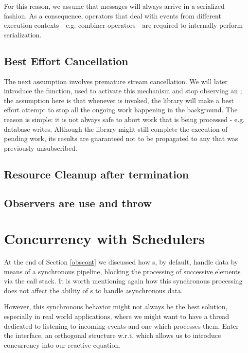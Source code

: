 For this reason, we assume that messages will always arrive in a serialized fashion. As a consequence, operators that deal with events from different execution contexts - e.g. combiner operators - are required to internally perform serialization.

\subsection{Best Effort Cancellation}
\label{ass-besteffort}
The next assumption involves premature stream cancellation. We will later introduce the  function, used to activate this mechanism and stop observing an ; the assumption here is that whenever  is invoked, the library will make a best effort attempt to stop all the ongoing work happening in the background. The reason is simple: it is not always safe to abort work that is being processed - e.g. database writes. Although the library might still complete the execution of pending work, its results are guaranteed not to be propagated to any  that was previously unsubscribed.

\subsection{Resource Cleanup after termination}
\subsection{Observers are use and throw}

\section{Concurrency with Schedulers}
\label{schedulers}

At the end of Section \ref{obscont} we discussed how s, by default, handle data by means of a synchronous pipeline, blocking the processing of successive elements via the call stack. It is worth mentioning again how this synchronous processing does not affect the ability of s to handle asynchronous data.

However, this synchronous behavior might not always be the best solution, especially in real world applications, where we might want to have a thread dedicated to listening to incoming events and one which processes them. Enter the  interface, an orthogonal\cite{wiki:orthogonality} structure w.r.t.  which allows us to introduce concurrency into our reactive equation. 

